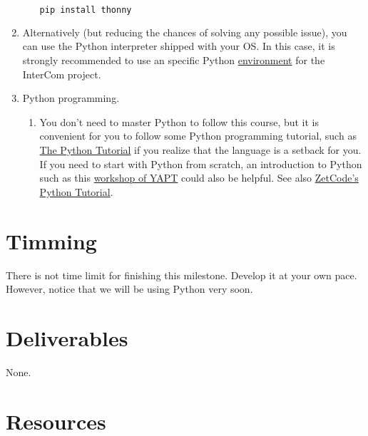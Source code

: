 \begin{enumerate}
\begin{enumerate}
    \begin{lstlisting}[language=Bash]
pip install thonny
    \end{lstlisting}

  \end{enumerate}

\item Alternatively (but reducing the chances of solving any possible
  issue), you can use the Python interpreter shipped with your OS. In
  this case, it is strongly recommended to use an specific Python
  \href{https://docs.python.org/3/library/venv.html}{environment} for
  the InterCom project.
  
\item Python programming.
  
  \begin{enumerate}
    
  \item You don't need to master Python to follow this course, but it
    is convenient for you to follow some Python programming tutorial,
    such as \href{https://docs.python.org/3/tutorial/}{The Python
    Tutorial} \cite{python-tutorial} if you realize that the language
    is a setback for you. If you need to start with Python from
    scratch, an introduction to Python such as
    this \href{https://github.com/vicente-gonzalez-ruiz/YAPT/tree/master/workshops/programacion_python_ESO}{workshop
    of YAPT} \cite{YAPT} could also be helpful. See
    also \href{http://zetcode.com/lang/python/}{ZetCode's Python
    Tutorial}.
    
  \end{enumerate}

\end{enumerate}

\section{Timming}

There is not time limit for finishing this milestone. Develop it at
your own pace. However, notice that we will be using Python very soon.

\section{Deliverables}

None.

\section{Resources}


